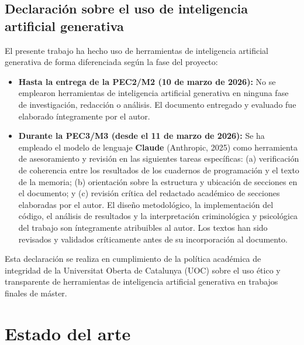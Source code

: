 \documentclass[IB]{TFUOC}%
\begin{document}
\section{Declaración sobre el uso de inteligencia artificial generativa}

El presente trabajo ha hecho uso de herramientas de inteligencia artificial 
generativa de forma diferenciada según la fase del proyecto:

\begin{itemize}
    \item \textbf{Hasta la entrega de la PEC2/M2 (10 de marzo de 2026):} 
    No se emplearon herramientas de inteligencia artificial generativa en 
    ninguna fase de investigación, redacción o análisis. El documento 
    entregado y evaluado fue elaborado íntegramente por el autor.

    \item \textbf{Durante la PEC3/M3 (desde el 11 de marzo de 2026):} 
    Se ha empleado el modelo de lenguaje \textbf{Claude} (Anthropic, 2025) 
    como herramienta de asesoramiento y revisión en las siguientes tareas 
    específicas: (a) verificación de coherencia entre los resultados de los 
    cuadernos de programación y el texto de la memoria; (b) 
    orientación sobre la estructura y ubicación de secciones en el documento; 
    y (c) revisión crítica del redactado académico de secciones elaboradas 
    por el autor. El diseño metodológico, la implementación del código, el 
    análisis de resultados y la interpretación criminológica y psicológica 
    del trabajo son íntegramente atribuibles al autor. Los textos han sido 
    revisados y validados críticamente antes de su incorporación al documento.
\end{itemize}

\noindent Esta declaración se realiza en cumplimiento de la política académica de 
integridad de la Universitat Oberta de Catalunya (UOC) sobre el uso ético 
y transparente de herramientas de inteligencia artificial generativa en 
trabajos finales de máster.



\chapter{Estado del arte}
\end{document}
